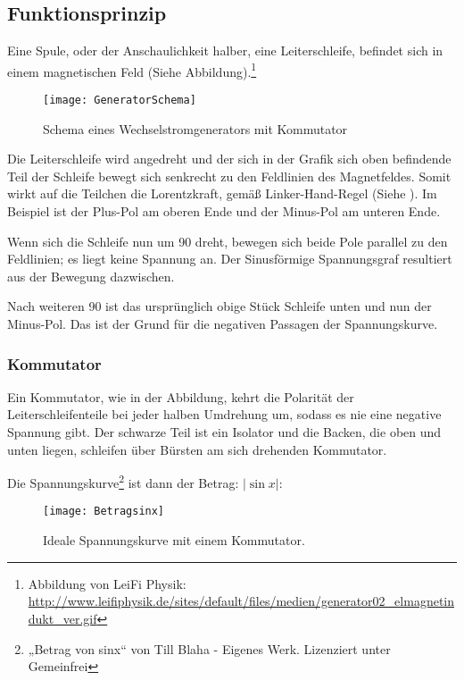 

\subsection{Funktionsprinzip}

Eine Spule, oder der Anschaulichkeit halber, eine Leiterschleife, befindet sich in einem magnetischen Feld (Siehe Abbildung).\footnote{Abbildung von LeiFi Physik: \url{http://www.leifiphysik.de/sites/default/files/medien/generator02_elmagnetindukt_ver.gif}}

\begin{figure}[h!]
	\centering
	\texttt{[image: GeneratorSchema]}
	\caption{Schema eines Wechselstromgenerators mit Kommutator} 
\end{figure}


Die Leiterschleife wird angedreht und der sich in der Grafik sich oben befindende Teil der Schleife bewegt sich senkrecht zu den Feldlinien des Magnetfeldes. Somit wirkt auf die Teilchen die Lorentzkraft, gemäß Linker-Hand-Regel (Siehe ). Im Beispiel ist der Plus-Pol am oberen Ende und der Minus-Pol am unteren Ende.

Wenn sich die Schleife nun um 90\degree{} dreht, bewegen sich beide Pole parallel zu den Feldlinien; es liegt keine Spannung an. Der Sinusförmige Spannungsgraf resultiert aus der Bewegung dazwischen.

Nach weiteren 90\degree{} ist das ursprünglich obige Stück Schleife unten und nun der Minus-Pol. Das ist der Grund für die negativen Passagen der Spannungskurve.


\subsubsection{Kommutator}

Ein Kommutator, wie in der Abbildung, kehrt die Polarität der Leiterschleifenteile bei jeder halben Umdrehung um, sodass es nie eine negative Spannung gibt. Der schwarze Teil ist ein Isolator und die Backen, die oben und unten liegen, schleifen über Bürsten am sich drehenden Kommutator.

Die Spannungskurve\footnote{„Betrag von sinx“ von Till Blaha - Eigenes Werk. Lizenziert unter Gemeinfrei} ist dann der Betrag: $|\sin x|$:

\begin{figure}[h!]
	\centering
	\texttt{[image: Betragsinx]}
	\caption{Ideale Spannungskurve mit einem Kommutator.} 
\end{figure}


